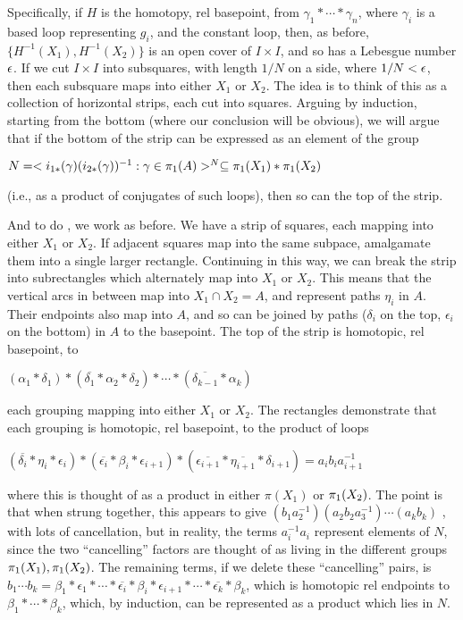 \msk

Specifically, if $H$ is the homotopy, rel basepoint, from 
$\gamma_1*\cdots *\gamma_n$,
where $\gamma_i$ is a based loop representing $g_i$, and the constant
loop, then, as before, $\{H^{-1}(X_1),H^{-1}(X_2)\}$ is an open cover 
of $I\times I$, and so has a Lebesgue number $\epsilon$. If we cut
$I\times I$ into subsquares, with length $1/N$ on a side, where $1/N<\epsilon$,
then each subsquare maps into either $X_1$ or $X_2$. The idea is to 
think of this as a collection of horizontal strips, each cut into squares.
Arguing by induction, starting from the bottom (where our conclusion
will be obvious), we will argue that if the bottom of the strip
can be expressed as an element of the group 

$N = <i_{1*}(\gamma)(i_{2*}(\gamma))^{-1} : 
\gamma\in\pi_1(A) >^N\subseteq \pi_1(X_1)*\pi_1(X_2)$ 

(i.e., as a product
of conjugates of such loops), then so can the 
top of the strip. 

\msk





\leavevmode

\epsfxsize=4in

\msk

And to do , we work as before. We have a strip of squares,
each mapping into either $X_1$ or $X_2$. If adjacent squares map into the
same subpace, amalgamate them into a single larger rectangle. Continuing
in this way, we can break the strip into subrectangles which
alternately map into $X_1$ or $X_2$. This means that the vertical arcs
in between map into $X_1\cap X_2 = A$, and represent paths $\eta_i$ in 
$A$. Their endpoints also map into $A$,
and so can be joined by paths ($\delta_i$  on the top, $\epsilon_i$ 
on the bottom) in $A$ to the basepoint. The top of the strip is
homotopic, rel basepoint, to 

$(\alpha_1*\delta_1)*(\overline{\delta_1}*\alpha_2*\delta_2)*\cdots *
(\overline{\delta_{k-1}}*\alpha_k)$

each grouping mapping into either $X_1$ or $X_2$.
The rectangles demonstrate that each grouping is homotopic, rel basepoint,
to the product of loops

$(\overline{\delta_i}*\eta_i*\epsilon_i)*
(\overline{\epsilon_i}*\beta_i*\epsilon_{i+1})*
(\overline{\epsilon_{i+1}}*\overline{\eta_{i+1}}*\delta_{i+1})
=a_i b_i a_{i+1}^{-1}$

where this is thought of as a product in either $\pi(X_1)$ or
$\pi_1(X_2)$. The point is that when strung together, this appears
to give $(b_1a_2^{-1})(a_2b_2a_3^{-1})\cdots (a_kb_k)$ , with lots
of cancellation, but in reality, the terms $a_i^{-1}a_i$ represent
elements of $N$, since the two ``cancelling'' 
factors are thought of as living in the
different groups $\pi_1(X_1),\pi_1(X_2)$. The remaining terms, if we
delete these ``cancelling'' pairs, is 
$b_1\cdots b_k = 
\beta_1*\epsilon_1*\cdots *\overline{\epsilon_i}*\beta_i*\epsilon_{i+1}
*\cdots * \overline{\epsilon_k}*\beta_k$, which is homotopic
rel endpoints to $\beta_1*\cdots *\beta_k$, which, by induction, can 
be represented as a product which lies in $N$. 

